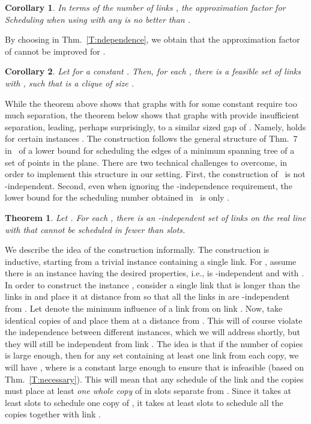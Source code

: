 \documentclass[11pt]{article}
\newtheorem{corollary}{Corollary}
\newtheorem{theorem}{Theorem}
\newcommand{\scheduling}{\textsf{Scheduling}}
\begin{document}
\begin{corollary}
In terms of the number of links , the approximation factor for {\scheduling} when using  with any  is no better than .
\end{corollary}


By choosing  in Thm.\ \ref{T:ndependence}, we obtain that the approximation factor of  cannot be improved for .

\begin{corollary}
Let  for a constant . Then, for each , there is a \emph{feasible} set of links  with , such that  is a clique of size .
\end{corollary}

While the theorem above shows that graphs  with  for some constant  require too much
separation,
the theorem below shows that graphs  with  provide insufficient separation, leading,
perhaps surprisingly, to a similar sized gap of . Namely,
 holds for certain instances . The construction 
follows the general structure of Thm.\ 7 in~\cite{halmitSODA12} of a lower bound for scheduling the edges of a minimum spanning tree of a set of points in the plane.
There are two technical challenges to overcome, in order to implement this
structure in our setting. First, the construction of~\cite{halmitSODA12} is not -independent. Second, even when
ignoring the -independence requirement, the lower bound for the scheduling number obtained in~\cite{halmitSODA12} is
only . 

\begin{theorem}\label{T:hardinstance}
Let . For each , there is an -independent set of links  on the real line with  that cannot be scheduled in fewer than  slots.
\end{theorem}
We describe the idea of the construction informally. The construction is inductive, starting from a trivial instance
 containing a single link. For , assume there is an instance  having the desired properties, i.e.,
 is -independent and with .
In order to construct the instance , consider a single link  that is longer than the links in  and
place it at distance  from  so that
all the links in  are -independent from . Let  denote the minimum influence of a link from  on link
. Now, take  identical copies of  and place them at a distance  from . This will of course violate the
independence between different instances, which we will address shortly, but they will still be independent from link
. The idea is that if the number of copies  is large enough, then for any set  containing at least one link
from each copy, we will have , where  is a constant large enough to ensure that  is
infeasible (based on Thm.\ \ref{T:necessary}). This will mean that any schedule of the link  and the  copies 
must place at least \emph{one whole copy} of  in slots separate from . Since it takes at least  slots to
schedule one copy of , it takes at least  slots to schedule
all the copies together with link .
\end{document}
